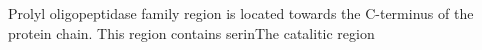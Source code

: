 Prolyl oligopeptidase family region is located towards the C-terminus of the protein chain. This region contains serinThe catalitic region 